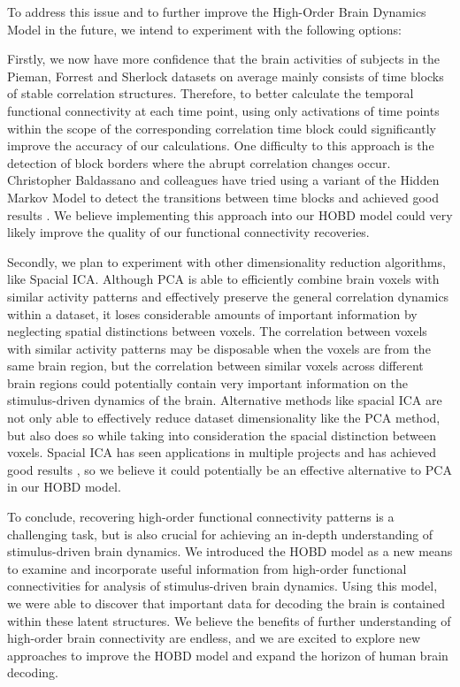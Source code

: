 \documentclass[11pt]{article}
\begin{document}
To address this issue and to further improve the High-Order Brain Dynamics Model in the future, we intend to experiment with the following options:

Firstly, we now have more confidence that the brain activities of subjects in the Pieman, Forrest and Sherlock datasets on average mainly consists of time blocks of stable correlation structures. Therefore, to better calculate the temporal functional connectivity at each time point, using only activations of time points within the scope of the corresponding correlation time block could significantly improve the accuracy of our calculations. One difficulty to this approach is the detection of block borders where the abrupt correlation changes occur. Christopher Baldassano and colleagues have tried using a variant of the Hidden Markov Model to detect the transitions between time blocks and achieved good results \citep{Baldassano2016}. We believe implementing this approach into our HOBD model could very likely improve the quality of our functional connectivity recoveries.

Secondly, we plan to experiment with other dimensionality reduction algorithms, like Spacial ICA. Although PCA is able to efficiently combine brain voxels with similar activity patterns and effectively preserve the general correlation dynamics within a dataset, it loses considerable amounts of important information by neglecting spatial distinctions between voxels. The correlation between voxels with similar activity patterns may be disposable when the voxels are from the same brain region, but the correlation between similar voxels across different brain regions could potentially contain very important information on the stimulus-driven dynamics of the brain. Alternative methods like spacial ICA are not only able to effectively reduce dataset dimensionality like the PCA method, but also does so while taking into consideration the spacial distinction between voxels. Spacial ICA has seen applications in multiple projects and has achieved good results \citep{Dipasquale2015}\citep{Iraji2016}\citep{Xu2013}, so we believe it could potentially be an effective alternative to PCA in our HOBD model.

To conclude, recovering high-order functional connectivity patterns is a challenging task, but is also crucial for achieving an in-depth understanding of stimulus-driven brain dynamics. We introduced the HOBD model as a new means to examine and incorporate useful information from high-order functional connectivities for analysis of stimulus-driven brain dynamics. Using this model, we were able to discover that important data for decoding the brain is contained within these latent structures. We believe the benefits of further understanding of high-order brain connectivity are endless, and we are excited to explore new approaches to improve the HOBD model and expand the horizon of human brain decoding.

\newpage


\end{document}
